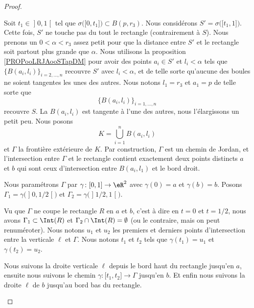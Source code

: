 \begin{proof}
\begin{subproof}
		Soit \( t_1\in \mathopen] 0,1\mathclose[\) tel que \( \sigma\big( \mathopen[ 0,t_1\mathclose] \big)\subset B(p,r_3)\). Nous considérons \( S'=\sigma\big( \mathopen[ t_1,1\mathclose] \big)\). Cette fois, \( S'\) ne touche pas du tout le rectangle (contrairement à \( S\)). Nous prenons un \( 0<\alpha<r_3\) assez petit pour que la distance entre \( S'\) et le rectangle soit partout plus grande que \( \alpha\). Nous utilisons la proposition \ref{PROPooLRJAooSTapDM} pour avoir des points \( a_i\in S'\) et \( l_i<\alpha\) tels que \( \{ B(a_i,l_i) \}_{i=2,\ldots,n}\) recouvre \( S'\) avec \( l_i<\alpha\), et de telle sorte qu'aucune des boules ne soient tangentes les unes des autres. Nous notons \( l_1=r_3\) et \( a_1=p\) de telle sorte que
		\begin{equation}
			\{ B(a_i,l_i) \}_{i=1,\ldots,n}
		\end{equation}
		recouvre \( S\). La \( B(a_i,l_i)\) est tangente à l'une des autres, nous l'élargissons un petit peu. Nous posons
		\begin{equation}
			K=\bigcup_{i=1}^nB(a_i,l_i)
		\end{equation}
		et \( \Gamma\) la frontière extérieure de \( K\). Par construction, \( \Gamma\) est un chemin de Jordan, et l'intersection entre \( \Gamma\) et le rectangle contient exactement deux points distincts \( a\) et \( b\) qui sont ceux d'intersection entre \( B(a_i,l_1)\) et le bord droit.

		Nous paramétrons \( \Gamma\) par \(\gamma \colon \mathopen[ 0,1\mathclose]\to \eR^2  \) avec \( \gamma(0)=a\) et \( \gamma(b)=b\). Posons \( \Gamma_1=\gamma\big( \mathopen] 0,1/2\mathclose[ \big)\) et \( \Gamma_2=\gamma\big( \mathopen] 1/2,1\mathclose[ \big)\).

		Vu que \( \Gamma\) ne coupe le rectangle \( R\) en \( a\) et \( b\), c'est à dire en \( t=0\) et \( t=1/2\), nous avons \( \Gamma_1\subset\Int(R)\) et \( \Gamma_2\cap\Int(R)=\emptyset\) (ou le contraire, mais on peut renuméroter). Nous notons \( u_1\) et \( u_2\) les premiers et derniers points d'intersection entre la verticale \( \ell\) et \( \Gamma\). Nous notons \( t_1\) et \( t_2\) tels que \( \gamma(t_1)=u_1\) et \( \gamma(t_2)=u_2\).

		\spitem[Le chemin]

		Nous suivons la droite verticale \( \ell\) depuis le bord haut du rectangle jusqu'en \( a\), ensuite nous suivons le chemin \(\gamma \colon \mathopen[ t_1,t_2\mathclose]\to \Gamma  \) jusqu'en \( b\). Et enfin nous suivons la droite \( \ell\) de \( b\) jusqu'au bord bas du rectangle.
	\end{subproof}
\end{proof}


